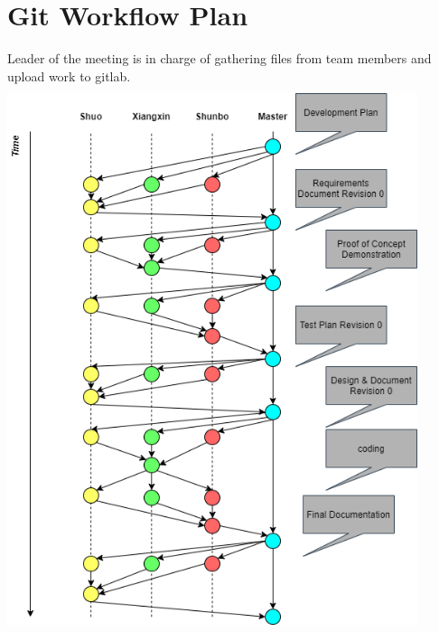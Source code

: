 \documentclass{article}
\begin{document}
\section{Git Workflow Plan}
    Leader of the meeting is in charge of gathering files from team members and upload work to gitlab.\\
    \includegraphics[width=12cm, height=16cm]{GitWorkFlow.png}
\end{document}
